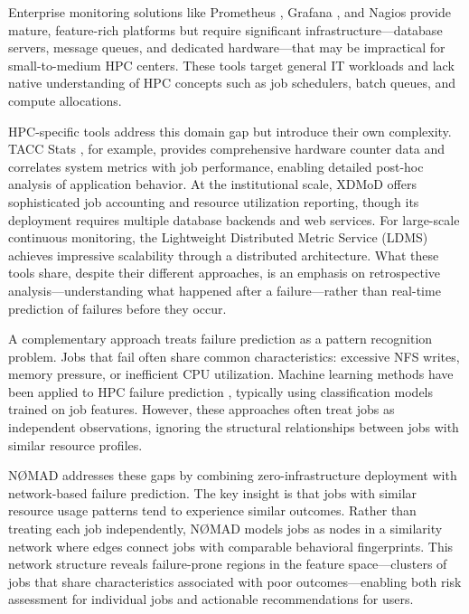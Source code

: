 \documentclass[11pt,a4paper]{article}
\begin{document}
Enterprise monitoring solutions like Prometheus \cite{prometheus}, Grafana \cite{grafana}, and Nagios \cite{nagios} provide mature, feature-rich platforms but require significant infrastructure---database servers, message queues, and dedicated hardware---that may be impractical for small-to-medium HPC centers. These tools target general IT workloads and lack native understanding of HPC concepts such as job schedulers, batch queues, and compute allocations.

HPC-specific tools address this domain gap but introduce their own complexity. TACC Stats \cite{tacc}, for example, provides comprehensive hardware counter data and correlates system metrics with job performance, enabling detailed post-hoc analysis of application behavior. At the institutional scale, XDMoD \cite{xdmod} offers sophisticated job accounting and resource utilization reporting, though its deployment requires multiple database backends and web services. For large-scale continuous monitoring, the Lightweight Distributed Metric Service (LDMS) \cite{ldms} achieves impressive scalability through a distributed architecture. What these tools share, despite their different approaches, is an emphasis on retrospective analysis---understanding what happened after a failure---rather than real-time prediction of failures before they occur.

A complementary approach treats failure prediction as a pattern recognition problem. Jobs that fail often share common characteristics: excessive NFS writes, memory pressure, or inefficient CPU utilization. Machine learning methods have been applied to HPC failure prediction \cite{mlhpc}, typically using classification models trained on job features. However, these approaches often treat jobs as independent observations, ignoring the structural relationships between jobs with similar resource profiles.

NØMAD addresses these gaps by combining zero-infrastructure deployment with network-based failure prediction. The key insight is that jobs with similar resource usage patterns tend to experience similar outcomes. Rather than treating each job independently, NØMAD models jobs as nodes in a similarity network where edges connect jobs with comparable behavioral fingerprints. This network structure reveals failure-prone regions in the feature space---clusters of jobs that share characteristics associated with poor outcomes---enabling both risk assessment for individual jobs and actionable recommendations for users.
\end{document}
